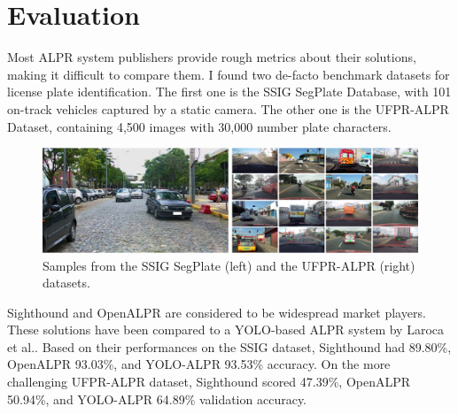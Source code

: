 \section{Evaluation}

Most ALPR system publishers provide rough metrics about their solutions, making it difficult to compare them. I found two de-facto benchmark datasets for license plate identification. The first one is the SSIG SegPlate Database\cite{SSIG-ALPR}, with 101 on-track vehicles captured by a static camera. The other one is the UFPR-ALPR Dataset\cite{UFPR-ALPR}, containing 4,500 images with 30,000 number plate characters.

\begin{figure}[htb]
 \centerline{\includegraphics[width=1.0\columnwidth]{.//Figure/ALPR/alpr-datasets.png}}
 \caption{Samples from the SSIG SegPlate\cite{SSIG-ALPR} (left) and the UFPR-ALPR\cite{UFPR-ALPR} (right) datasets.}
 \label{fig:alpr-datasets}
\end{figure}

Sighthound\cite{Sighthound} and OpenALPR\cite{OpenALPR} are considered to be widespread market players. These solutions have been compared to a YOLO-based ALPR system by Laroca et al.\cite{RobustRealTimeALPR_YOLO}. Based on their performances on the SSIG dataset, Sighthound had 89.80\%, OpenALPR 93.03\%, and YOLO-ALPR 93.53\% accuracy. On the more challenging UFPR-ALPR dataset, Sighthound scored 47.39\%, OpenALPR 50.94\%, and YOLO-ALPR 64.89\% validation accuracy.

